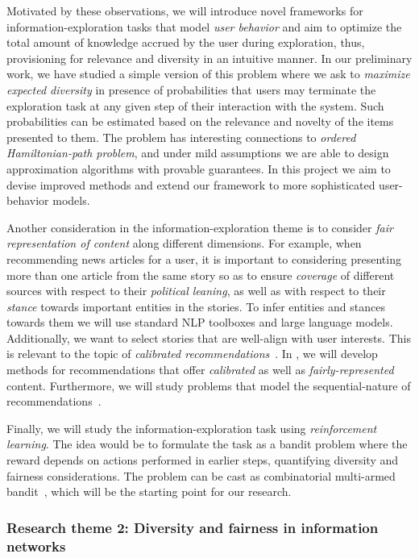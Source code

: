 \documentclass[a4paper,11pt]{article}
\begin{document}
Motivated by these observations, 
we will introduce novel frameworks for information-exploration tasks
that model \emph{user behavior} and aim to optimize 
the total amount of knowledge accrued by the user during exploration, 
thus, provisioning for relevance and diversity in an intuitive manner.
In our preliminary work, we have studied a simple version 
of this problem where we ask to \emph{maximize expected diversity} 
in presence of probabilities that users may terminate the exploration task
at any given step of their interaction with the system.
Such probabilities can be estimated based on the relevance and novelty
of the items presented to them.
The problem has interesting connections to \emph{ordered Hamiltonian-path problem}, 
and under mild assumptions we are able to design approximation algorithms
with provable guarantees.
In this project we aim to devise improved methods
and extend our framework to more sophisticated user-behavior models.

Another consideration in the information-exploration theme
is to consider \emph{fair representation of content} along different dimensions. 
For example, when recommending news articles for a user, 
it is important to considering presenting more than one article from the same story
so as to ensure \emph{coverage} of different sources with respect to their \emph{political leaning}, 
as well as with respect to their \emph{stance} towards important entities in the stories. 
To infer entities and stances towards them we will use standard NLP toolboxes and large language models.
Additionally, we want to select stories that are well-align with user interests. 
This is relevant to the topic of \emph{calibrated recommendations}~\cite{wang2022improving}.
In \acronym, we will develop methods for recommendations that 
offer \emph{calibrated} as well as \emph{fairly-represented} content.
Furthermore, we will study problems that model the sequential-nature of recommendations~\cite{zhang2022ranking}.

Finally, we will study the information-exploration task using \emph{reinforcement learning}.
The idea would be to formulate the task as a bandit problem
where the reward depends on actions performed in earlier steps, 
quantifying diversity and fairness considerations. 
The problem can be cast as combinatorial multi-armed bandit~\cite{chen2013combinatorial}, 
which will be the starting point for our research. 

\subsubsection*{Research theme 2: Diversity and fairness in information networks}
\end{document}
